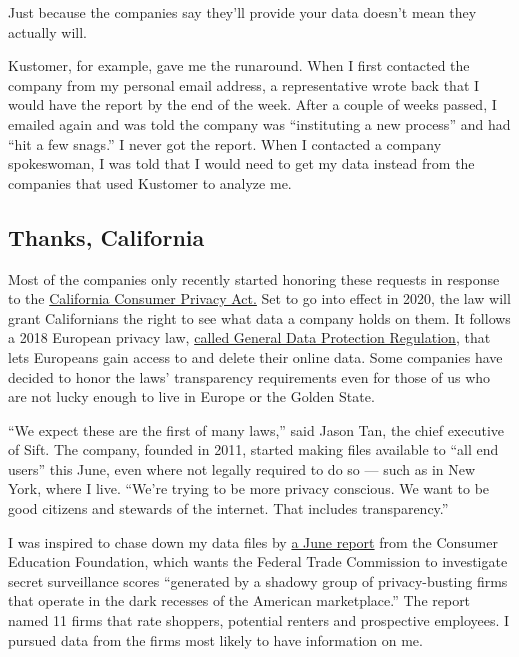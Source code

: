 Just because the companies say they'll provide your data doesn't mean
they actually will.

Kustomer, for example, gave me the runaround. When I first contacted the
company from my personal email address, a representative wrote back that
I would have the report by the end of the week. After a couple of weeks
passed, I emailed again and was told the company was ``instituting a new
process'' and had ``hit a few snags.'' I never got the report. When I
contacted a company spokeswoman, I was told that I would need to get my
data instead from the companies that used Kustomer to analyze me.

\hypertarget{thanks-california}{%
\subsection{Thanks, California}\label{thanks-california}}

Most of the companies only recently started honoring these requests in
response to the
\href{https://www.nytimes.com/2018/06/28/technology/california-online-privacy-law.html}{California
Consumer Privacy Act.} Set to go into effect in 2020, the law will grant
Californians the right to see what data a company holds on them. It
follows a 2018 European privacy law,
\href{https://www.nytimes.com/2018/05/24/technology/europe-gdpr-privacy.html}{called
General Data Protection Regulation}, that lets Europeans gain access to
and delete their online data. Some companies have decided to honor the
laws' transparency requirements even for those of us who are not lucky
enough to live in Europe or the Golden State.

``We expect these are the first of many laws,'' said Jason Tan, the
chief executive of Sift. The company, founded in 2011, started making
files available to ``all end users'' this June, even where not legally
required to do so --- such as in New York, where I live. ``We're trying
to be more privacy conscious. We want to be good citizens and stewards
of the internet. That includes transparency.''

I was inspired to chase down my data files by
\href{https://www.representconsumers.org/wp-content/uploads/2019/06/2019.06.24-FTC-Letter-Surveillance-Scores.pdf}{a
June report} from the Consumer Education Foundation, which wants the
Federal Trade Commission to investigate secret surveillance scores
``generated by a shadowy group of privacy-busting firms that operate in
the dark recesses of the American marketplace.'' The report named 11
firms that rate shoppers, potential renters and prospective employees. I
pursued data from the firms most likely to have information on me.

